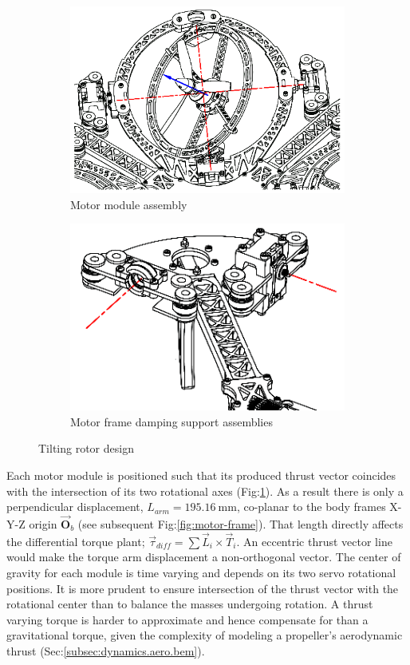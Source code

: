 \begin{figure}[hbtp]
\begin{subfigure}{.49\textwidth}
\centering
\includegraphics[width=\textwidth]{figs/motor-assembly}
\caption{Motor module assembly}
\label{fig:motor-assembly}
\end{subfigure}
\begin{subfigure}{.49\textwidth}
\centering
\includegraphics[width=\textwidth]{figs/motor-support}
\caption{Motor frame damping support assemblies}
\label{fig:motor_support}
\end{subfigure}
\caption{Tilting rotor design}
\end{figure}
Each motor module is positioned such that its produced thrust vector coincides with the intersection of its two rotational axes (Fig:\ref{fig:motor-assembly}). As a result there is only a perpendicular displacement, $L_{arm}=195.16~\text{mm}$, co-planar to the body frames X-Y-Z origin $\vec{\mathbf{O}}_b$ (see subsequent Fig:\ref{fig:motor-frame}). That length directly affects the differential torque plant; $\vec{\tau}_{diff}=\sum\vec{L}_i\times\vec{T}_i$. An eccentric thrust vector line would make the torque arm displacement a non-orthogonal vector. The center of gravity for each module is time varying and depends on its two servo rotational positions. It is more prudent to ensure intersection of the thrust vector with the rotational center than to balance the masses undergoing rotation. A thrust varying torque is harder to approximate and hence compensate for than a gravitational torque, given the complexity of modeling a propeller's aerodynamic thrust (Sec:\ref{subsec:dynamics.aero.bem}).
